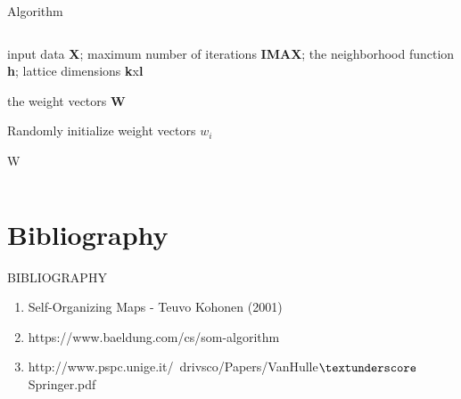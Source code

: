 \documentclass{beamer}
\begin{document}
	\begin{frame}{Algorithm}

		\begin{columns}


				\begin{algorithm}[H]
			
					\caption{Self-Organizing Map Algorithm}
					\begin{algorithmic}[1]		
					
						\REQUIRE input data \textbf{X}; maximum number of iterations \textbf{IMAX}; the neighborhood function \textbf{h}; lattice dimensions \textbf{k}x\textbf{l}
			
						\ENSURE the weight vectors \textbf{W}
						
						\STATE Randomly initialize weight vectors $w_i$	
									

						  \ENDFOR
				

						\RETURN W
					\end{algorithmic}
				\end{algorithm}
		\end{columns}
	\end{frame}
	


\section{Bibliography}
	
	\begin{frame}
	
		\begin{center}

			\Huge BIBLIOGRAPHY
		\end{center}
	\end{frame}


	\begin{frame}
	
		\begin{enumerate}
			
			\item Self-Organizing Maps - Teuvo Kohonen (2001)
			\item https://www.baeldung.com/cs/som-algorithm
			\item http://www.pspc.unige.it/~drivsco/Papers/VanHulle$\textunderscore$Springer.pdf
		\end{enumerate}
	\end{frame}
\end{document}
